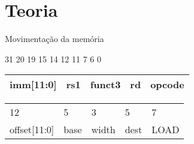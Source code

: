     \section{Teoria}

    \begin{frame}{Movimentação da memória}
        
        \begin{center}

            \begin{flushleft}
                \footnotesize
                31 \hspace{2.95cm} 20 19 \hspace{1.52cm} 15 14 \hspace{1.50cm} 12 11 \hspace{1.70cm} 7 6 \hspace{2cm} 0
                \normalsize
            \end{flushleft}
            
            \begin{tabular}{ | p{3cm} | p{2cm} | p{2cm} | p{2cm} | p{2cm} | }
                \hline
                imm[11:0] & rs1 & funct3 & rd & opcode \\
                \hline
            \end{tabular}
            \begin{tabular}{p{3cm} p{2cm} p{2cm} p{2cm} p{2cm}}
             12 & 5 & 3 & 5 & 7 \\ 
             offset[11:0] & base & width & dest & LOAD    
            \end{tabular}

        \end{center}

\end{frame}

